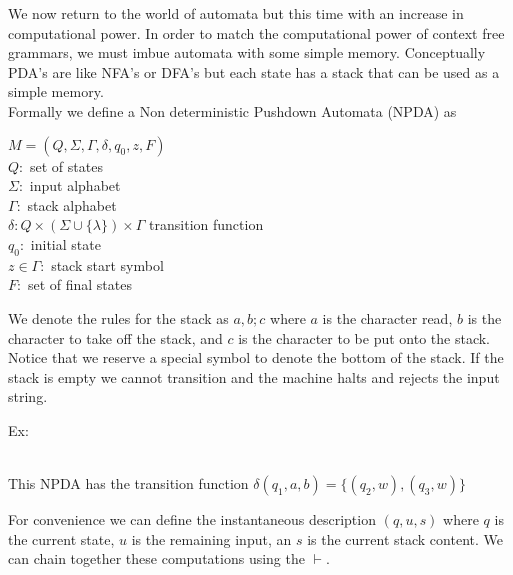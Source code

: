 \documentclass[11pt]{exam}
\begin{document}
We now return to the world of automata but this time with an increase in computational power. In order to match the computational power of context free grammars, we must imbue automata with some simple memory. Conceptually PDA's are like NFA's or DFA's but each state has a stack that can be used as a simple memory.\\

Formally we define a Non deterministic Pushdown Automata (NPDA) as
\begin{center}
$M = (Q,\Sigma,\Gamma,\delta,q_0,z,F)$\\
$Q :$ set of states\\
$\Sigma :$ input alphabet\\
$\Gamma :$ stack alphabet\\
$\delta : Q \times (\Sigma \cup \{\lambda\}) \times \Gamma$ transition function\\
$q_0 :$ initial state\\
$z \in \Gamma :$ stack start symbol\\
$F :$ set of final states\\
\end{center}

We denote the rules for the stack as $a,b ; c$ where $a$ is the character read, $b$ is the character to take off the stack, and $c$ is the character to be put onto the stack. Notice that we reserve a special symbol to denote the bottom of the stack. If the stack is empty we cannot transition and the machine halts and rejects the input string. 

Ex:
\begin{center}
\\
This NPDA has the transition function $\delta(q_1,a,b) = \{(q_2,w), (q_3,w)\}$
\end{center}

For convenience we can define the instantaneous description $(q,u,s)$ where $q$ is the current state, $u$ is the remaining input, an $s$ is the current stack content. We can chain together these computations using the $\vdash$.\\
\end{document}
